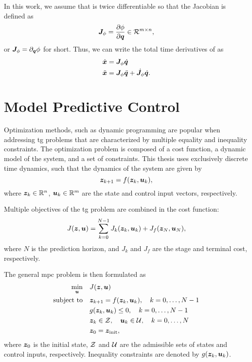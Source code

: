 In this work, we assume that \map{} is twice
differentiable so that the Jacobian is defined as
\begin{equation}
  \bm{J}_{\phi} = \frac{\partial\phi}{\partial\bm{q}} \in \mathcal{R}^{m\times n}, 
\end{equation}
or $\bm{J}_{\phi} = \partial_{\bm{q}}\phi$ for short.
Thus, we can write the total time derivatives of \x{} as
\begin{align}
  \dot{\bm{x}} &= \bm{J}_{\phi}\dot{\bm{q}} \\
  \ddot{\bm{x}} &= \bm{J}_{\phi}\ddot{\bm{q}} + \dot{\bm{J}}_{\phi}\dot{\bm{q}}.
\end{align}


\section{Model Predictive Control} %
\label{sec:model_predictive_control}

Optimization methods, such as dynamic programming are
popular when addressing \ac{tg} problems that are
characterized by multiple equality and inequality
constraints. 
The optimization problem is composed of a cost function, 
a dynamic model of the system, and a set of constraints.
%
This thesis uses exclusively discrete time dynamics, such
that the dynamics of the system are given by 
\begin{equation}
  \bm{z}_{k+1} = f(\bm{z}_k, \bm{u}_k),
\end{equation}
where $\bm{z}_k \in \mathbb{R}^n$, $\bm{u}_k \in \mathbb{R}^m$ are the state and
control input vectors, respectively. 

Multiple objectives of the \ac{tg} problem are combined in
the cost function:
\begin{equation}
  J(\bm{z},\bm{u}) = \sum_{k=0}^{N-1} J_k(\bm{z}_k, \bm{u}_k) + J_f(\bm{z}_N,\bm{u}_N),
\end{equation}
where $N$ is the prediction horizon, and $J_k$ and $J_f$ are
the stage and terminal cost, respectively.

The general \ac{mpc} problem is then formulated as
\begin{equation}
  \begin{aligned}
    \min_{\bm{u}} \quad & J(\bm{z},\bm{u}) \\
    \text{subject to} \quad & \bm{z}_{k+1} = f(\bm{z}_k, \bm{u}_k), \quad k=0,\ldots,N-1 \\
    & g(\bm{z}_k, \bm{u}_k) \leq 0, \quad k=0,\ldots,N-1 \\
    & \bm{z}_k \in \mathcal{Z}, \quad \bm{u}_k \in \mathcal{U}, \quad k=0,\ldots,N \\
    & \bm{z}_0 = \bm{z}_{\textrm{init}},
  \end{aligned}
\end{equation}
where $\bm{z}_0$ is the initial state, $\mathcal{Z}$ and $\mathcal{U}$ are the
admissible sets of states and control inputs, respectively.
Inequality constraints are denoted by $g(\bm{z}_k, \bm{u}_k)$.

